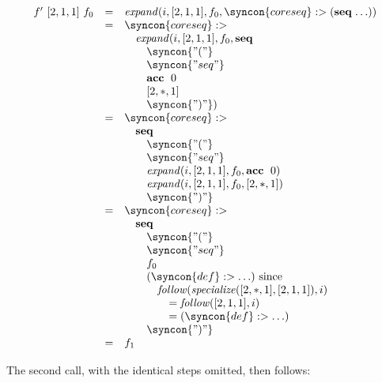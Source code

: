 \documentclass{kththesis}
\begin{document}
$$
\begin{array}{rcl}
f'~[2, 1, 1]~f_0 & = & \expand(i, [2, 1, 1], f_0, \syncon{coreseq} :> (\seq \ldots)) \\
& = & \syncon{coreseq} :> \\
& & \quad \expand(i, [2, 1, 1], f_0, \seq \\
& & \qquad \syncon{"("} \\
& & \qquad \syncon{"seq"} \\
& & \qquad \acc~0 \\
& & \qquad [2, *, 1] \\
& & \qquad \syncon{")"}) \\
& = & \syncon{coreseq} :> \\
& & \quad \seq \\
& & \qquad \syncon{"("} \\
& & \qquad \syncon{"seq"} \\
& & \qquad \expand(i, [2, 1, 1], f_0, \acc~0) \\
& & \qquad \expand(i, [2, 1, 1], f_0, [2, *, 1]) \\
& & \qquad \syncon{")"} \\
& = & \syncon{coreseq} :> \\
& & \quad \seq \\
& & \qquad \syncon{"("} \\
& & \qquad \syncon{"seq"} \\
& & \qquad f_0 \\
& & \qquad (\syncon{def} :> \ldots) \text{ since} \\
& & \qquad \quad \follow(\specialize([2, *, 1], [2, 1, 1]), i) \\
& & \qquad \qquad = \follow([2, 1, 1], i) \\
& & \qquad \qquad = (\syncon{def} :> \ldots) \\
& & \qquad \syncon{")"} \\
& = & f_1 \\
\end{array}
$$

The second call, with the identical steps omitted, then follows:
\end{document}

